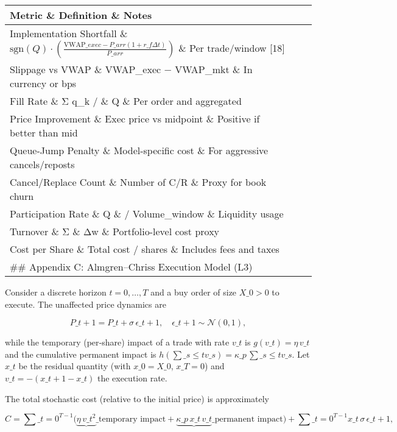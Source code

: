 \documentclass[11pt,a4paper]{article}
\begin{document}
\begin{longtable}{lll}
\toprule
Metric \& Definition \& Notes \\
\midrule
Implementation Shortfall \& $\text{sgn}(Q) \cdot \left(\frac{\text{VWAP}\_{exec} - P\_{arr}(1+r\_f \Delta t)}{P\_{arr}}\right)$ \& Per trade/window [18] \\
Slippage vs VWAP \& VWAP\_exec − VWAP\_mkt \& In currency or bps \\
Fill Rate \& Σ q\_k / \& Q \& Per order and aggregated \\
Price Improvement \& Exec price vs midpoint \& Positive if better than mid \\
Queue-Jump Penalty \& Model-specific cost \& For aggressive cancels/reposts \\
Cancel/Replace Count \& Number of C/R \& Proxy for book churn \\
Participation Rate \& Q \& / Volume\_window \& Liquidity usage \\
Turnover \& Σ \& Δw \& Portfolio-level cost proxy \\
Cost per Share \& Total cost / shares \& Includes fees and taxes \\
\#\# Appendix C: Almgren–Chriss Execution Model (L3) \\
\bottomrule
\end{longtable}


Consider a discrete horizon $t=0,\ldots,T$ and a buy order of size $X\_0>0$ to execute. The unaffected price dynamics are

\begin{equation}
P\_{t+1} = P\_t + \sigma\,\epsilon\_{t+1},\quad \epsilon\_{t+1}\sim\mathcal{N}(0,1),
\end{equation}

while the temporary (per‑share) impact of a trade with rate $v\_t$ is $g(v\_t)=\eta\,v\_t$ and the cumulative permanent impact is $h(\sum\_{s\le t} v\_s)=\kappa\_p\,\sum\_{s\le t} v\_s$. Let $x\_t$ be the residual quantity (with $x\_0=X\_0$, $x\_T=0$) and $v\_t=-(x\_{t+1}-x\_t)$ the execution rate.

The total stochastic cost (relative to the initial price) is approximately

\begin{equation}
C = \sum\_{t=0}^{T-1} \big( \underbrace{\eta\,v\_t^2}\_{\text{temporary impact}} + \underbrace{\kappa\_p\,x\_t\,v\_t}\_{\text{permanent impact}} \big) + \sum\_{t=0}^{T-1} x\_t\,\sigma\,\epsilon\_{t+1},
\end{equation}
\end{document}
